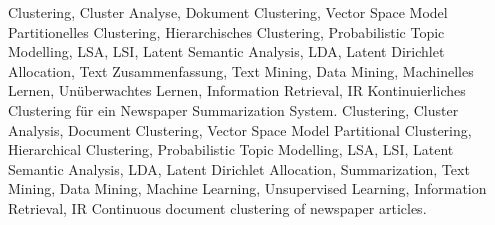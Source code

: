 \HAWAbstractPage
  {
    Clustering, 
    Cluster Analyse, 
    Dokument Clustering, Vector Space Model
    Partitionelles Clustering,
    Hierarchisches Clustering,
    Probabilistic Topic Modelling, 
    LSA, LSI, Latent Semantic Analysis,
    LDA, Latent Dirichlet Allocation, 
    Text Zusammenfassung,
    Text Mining, Data Mining,
    Machinelles Lernen, Unüberwachtes Lernen, 
    Information Retrieval, IR
  }
  { 
    Kontinuierliches Clustering für ein Newspaper Summarization System.
  }
  { 
    Clustering, 
    Cluster Analysis, 
    Document Clustering, Vector Space Model
    Partitional Clustering,
    Hierarchical Clustering,
    Probabilistic Topic Modelling, 
    LSA, LSI, Latent Semantic Analysis,
    LDA, Latent Dirichlet Allocation, 
    Summarization,
    Text Mining, Data Mining,
    Machine Learning, Unsupervised Learning, 
    Information Retrieval, IR
  }
  {
    Continuous document clustering of newspaper articles.
  }